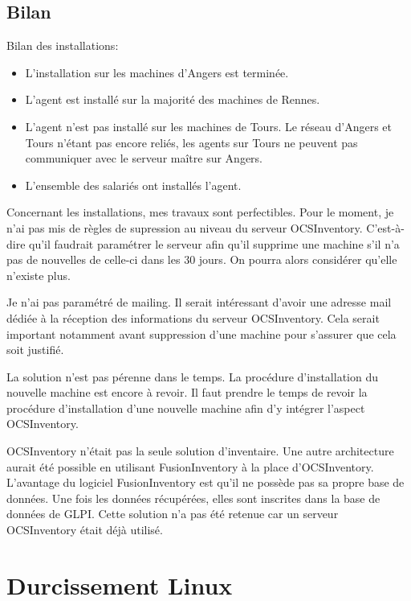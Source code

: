 \documentclass[12pt, a4paper, twoside]{article}
\begin{document}
\subsection{Bilan}

Bilan des installations: 
\begin{itemize}
    \item L'installation sur les machines d'Angers est terminée.
    \item L'agent est installé sur la majorité des machines de Rennes.
    \item L'agent n'est pas installé sur les machines de Tours. 
    Le réseau d'Angers et Tours n'étant pas encore reliés, les agents sur Tours ne peuvent pas communiquer avec le serveur maître sur Angers.
    \item L'ensemble des salariés ont installés l'agent.
\end{itemize}

Concernant les installations, mes travaux sont perfectibles.
Pour le moment, je n'ai pas mis de règles de supression au niveau du serveur \gls{OCSInventory}.
C'est-à-dire qu'il faudrait paramétrer le serveur afin qu'il supprime une machine s'il n'a pas de nouvelles de celle-ci dans les 30 jours.
On pourra alors considérer qu'elle n'existe plus.

Je n'ai pas paramétré de mailing.
Il serait intéressant d'avoir une adresse mail dédiée à la réception des informations du serveur \gls{OCSInventory}.
Cela serait important notamment avant suppression d'une machine pour s'assurer que cela soit justifié.

La solution n'est pas pérenne dans le temps.
La procédure d'installation du nouvelle machine est encore à revoir.
Il faut prendre le temps de revoir la procédure d'installation d'une nouvelle machine afin d'y intégrer l'aspect \gls{OCSInventory}.

\gls{OCSInventory} n'était pas la seule solution d'inventaire.
Une autre architecture aurait été possible en utilisant FusionInventory à la place d'\gls{OCSInventory}. 
L'avantage du logiciel FusionInventory est qu'il ne possède pas sa propre base de données. 
Une fois les données récupérées, elles sont inscrites dans la base de données de \gls{GLPI}. 
Cette solution n'a pas été retenue car un serveur \gls{OCSInventory} était déjà utilisé.

\newpage
\section{Durcissement Linux}
\end{document}
